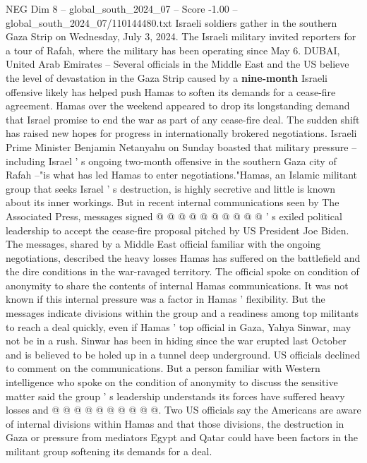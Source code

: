 \begin{textsample}{NEG Dim 8 – global\_south\_2024\_07 – Score -1.00 – global\_south\_2024\_07/110144480.txt}  \label{ex:f8_neg_114}
Israeli soldiers gather in the southern Gaza Strip on Wednesday, July 3, 2024.
The Israeli military invited reporters for a tour of Rafah, where the military has been operating since May 6.
DUBAI, United Arab Emirates -- Several officials in the Middle East and the US believe the level of devastation in the Gaza Strip caused by a \textbf{nine-month} Israeli offensive likely has helped push Hamas to soften its demands for a cease-fire agreement.
Hamas over the weekend appeared to drop its longstanding demand that Israel promise to end the war as part of any cease-fire deal.
The sudden shift has raised new hopes for progress in internationally brokered negotiations.
Israeli Prime Minister Benjamin Netanyahu on Sunday boasted that military pressure -- including Israel ' s ongoing two-month offensive in the southern Gaza city of Rafah --"is what has led Hamas to enter negotiations."Hamas, an Islamic militant group that seeks Israel ' s destruction, is highly secretive and little is known about its inner workings.
But in recent internal communications seen by The Associated Press, messages signed @ @ @ @ @ @ @ @ @ @ ' s exiled political leadership to accept the cease-fire proposal pitched by US President Joe Biden.
The messages, shared by a Middle East official familiar with the ongoing negotiations, described the heavy losses Hamas has suffered on the battlefield and the dire conditions in the war-ravaged territory.
The official spoke on condition of anonymity to share the contents of internal Hamas communications.
It was not known if this internal pressure was a factor in Hamas ' flexibility.
But the messages indicate divisions within the group and a readiness among top militants to reach a deal quickly, even if Hamas ' top official in Gaza, Yahya Sinwar, may not be in a rush.
Sinwar has been in hiding since the war erupted last October and is believed to be holed up in a tunnel deep underground.
US officials declined to comment on the communications.
But a person familiar with Western intelligence who spoke on the condition of anonymity to discuss the sensitive matter said the group ' s leadership understands its forces have suffered heavy losses and @ @ @ @ @ @ @ @ @ @.
Two US officials say the Americans are aware of internal divisions within Hamas and that those divisions, the destruction in Gaza or pressure from mediators Egypt and Qatar could have been factors in the militant group softening its demands for a deal.

\end{textsample}
